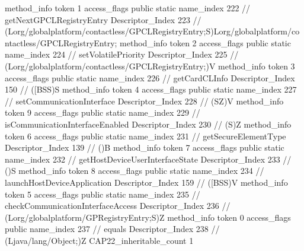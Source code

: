 {{{{{				}
				method_info {
					token	1
					access_flags	public static
					name_index	222		// getNextGPCLRegistryEntry
					Descriptor_Index	223		// (Lorg/globalplatform/contactless/GPCLRegistryEntry;S)Lorg/globalplatform/contactless/GPCLRegistryEntry;
				}
				method_info {
					token	2
					access_flags	public static
					name_index	224		// setVolatilePriority
					Descriptor_Index	225		// (Lorg/globalplatform/contactless/GPCLRegistryEntry;)V
				}
				method_info {
					token	3
					access_flags	public static
					name_index	226		// getCardCLInfo
					Descriptor_Index	150		// ([BSS)S
				}
				method_info {
					token	4
					access_flags	public static
					name_index	227		// setCommunicationInterface
					Descriptor_Index	228		// (SZ)V
				}
				method_info {
					token	9
					access_flags	public static
					name_index	229		// isCommunicationInterfaceEnabled
					Descriptor_Index	230		// (S)Z
				}
				method_info {
					token	6
					access_flags	public static
					name_index	231		// getSecureElementType
					Descriptor_Index	139		// ()B
				}
				method_info {
					token	7
					access_flags	public static
					name_index	232		// getHostDeviceUserInterfaceState
					Descriptor_Index	233		// ()S
				}
				method_info {
					token	8
					access_flags	public static
					name_index	234		// launchHostDeviceApplication
					Descriptor_Index	159		// ([BSS)V
				}
				method_info {
					token	5
					access_flags	public static
					name_index	235		// checkCommunicationInterfaceAccess
					Descriptor_Index	236		// (Lorg/globalplatform/GPRegistryEntry;S)Z
				}
				method_info {
					token	0
					access_flags	public
					name_index	237		// equals
					Descriptor_Index	238		// (Ljava/lang/Object;)Z
				}
			}
			CAP22_inheritable_count	1
		}
	}
}
